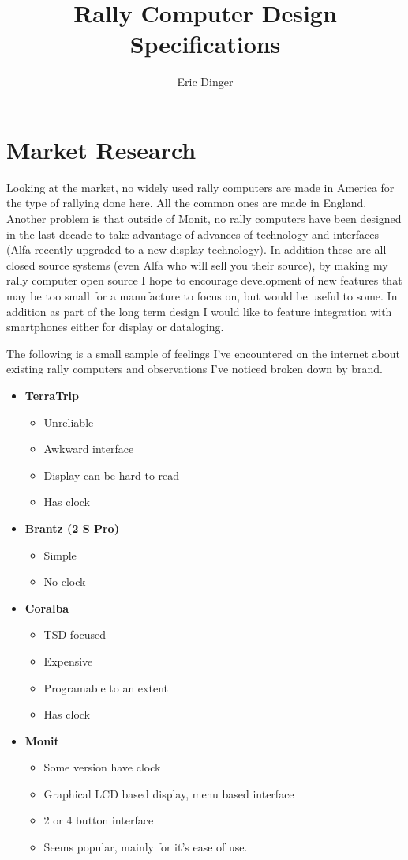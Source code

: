 \documentclass[letterpaper,11pt]{article}
\author{Eric Dinger}
\title{Rally Computer Design Specifications}
\begin{document}
\maketitle

\tableofcontents
\section{Market Research}
Looking at the market, no widely used rally computers are made in America for the type of rallying done here. All the common ones are made in England. Another problem is that outside of Monit, 
no rally computers have been designed in the last decade to take advantage of advances of technology and interfaces (Alfa recently upgraded to a new display technology). In addition these are all closed source systems (even Alfa who will sell you their source), by making my rally computer open source I hope to encourage development of new features that may be too small for a manufacture to focus on, but would be useful to some. In addition as part of the long term design I would like to feature integration with smartphones either for display or dataloging.

The following is a small sample of feelings I've encountered on the internet about existing rally computers and observations I've noticed broken down by brand.
\begin{itemize}
	\item \textbf{TerraTrip}
	\begin{itemize}
		\item Unreliable
		\item Awkward interface
		\item Display can be hard to read
		\item Has clock
	\end{itemize}
	\item \textbf{Brantz (2 S Pro)}
	\begin{itemize}
		\item Simple
		\item No clock
	\end{itemize}
	\item \textbf{Coralba}
	\begin{itemize}
		\item TSD focused
		\item Expensive
		\item Programable to an extent
		\item Has clock
	\end{itemize}
	\item \textbf{Monit}
	\begin{itemize}
		\item Some version have clock
		\item Graphical LCD based display, menu based interface
		\item 2 or 4 button interface
		\item Seems popular, mainly for it's ease of use.
	\end{itemize}
\end{itemize}
\end{document}
